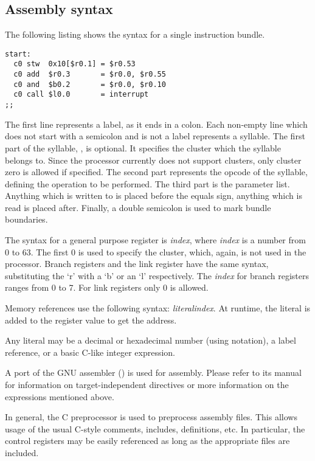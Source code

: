  
\subsection{Assembly syntax}
\label{sec:core-ug-isa-assembly}

The following listing shows the syntax for a single instruction bundle.

\begin{lstlisting}[numbers=none, basicstyle=\footnotesize, language=vexasm]
start:
  c0 stw  0x10[$r0.1] = $r0.53
  c0 add  $r0.3       = $r0.0, $r0.55
  c0 and  $b0.2       = $r0.0, $r0.10
  c0 call $l0.0       = interrupt
;;
\end{lstlisting}

The first line represents a label, as it ends in a colon. Each non-empty line 
which does not start with a semicolon and is not a label represents a syllable. 
The first part of the syllable, , is optional. It specifies the cluster 
which the syllable belongs to. Since the \rvex{} processor currently does not 
support clusters, only cluster zero is allowed if specified. The second part 
represents the opcode of the syllable, defining the operation to be performed. 
The third part is the parameter list. Anything which is written to is placed 
before the equals sign, anything which is read is placed after. Finally, a 
double semicolon is used to mark bundle boundaries.

The syntax for a general purpose register is \textit{index}, where 
\textit{index} is a number from 0 to 63. The first 0 is used to specify the 
cluster, which, again, is not used in the \rvex{} processor. Branch registers 
and the link register have the same syntax, substituting the `r' with a `b' or 
an `l' respectively. The \textit{index} for branch registers ranges from 0 to 7. 
For link registers only 0 is allowed.

Memory references use the following syntax:
\textit{literal}\code{[$r0.}\textit{index}\code{]}. At runtime, the literal is
added to the register value to get the address.

Any literal may be a decimal or hexadecimal number (using  notation),
a label reference, or a basic C-like integer expression.

A port of the GNU assembler () is used for assembly. Please refer to
its manual for information on target-independent directives or more information
on the expressions mentioned above.

In general, the C preprocessor is used to preprocess assembly files. This allows
usage of the usual C-style comments, includes, definitions, etc. In particular,
the control registers may be easily referenced as long as the appropriate files
are included.

